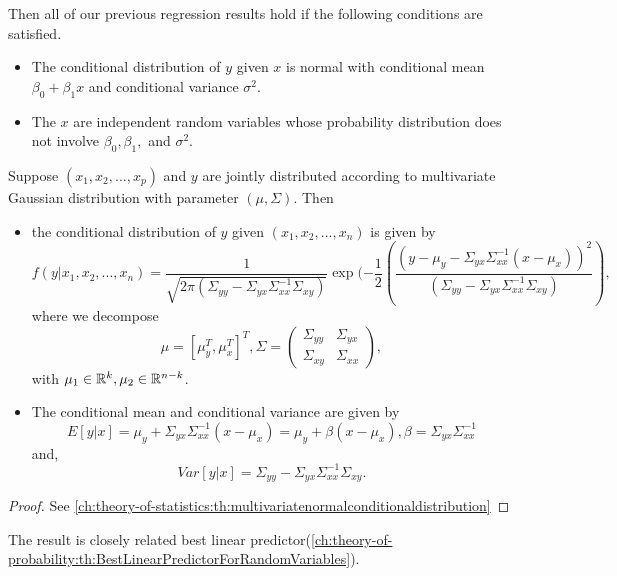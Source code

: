 \begin{refsection}
\begin{note}
Then all of our previous regression results hold if the following conditions are satisfied.
\begin{itemize}
	\item The conditional distribution of $y$ given $x$ is normal with conditional mean $\beta_0 + \beta_1 x$ and conditional variance $\sigma^2$.
	\item The $x$ are independent random variables whose probability distribution does not involve $\beta_0,\beta_1,$ and $\sigma^2$.
\end{itemize}	
\end{note}


\begin{theorem}
Suppose $(x_1,x_2,...,x_p)$ and $y$ are jointly distributed	according to multivariate Gaussian distribution with parameter $(\mu,\Sigma)$.
Then 
\begin{itemize}
	\item the conditional distribution of $y$ given $(x_1,x_2,...,x_n)$ is given by	
		$$f(y|x_1,x_2,...,x_n)= \frac{1}{\sqrt{2\pi(\Sigma_{yy} - \Sigma_{yx}\Sigma_{xx}^{-1}\Sigma_{xy})}}\exp(-\frac{1}{2}(\frac{(y - \mu_y - \Sigma_{yx}\Sigma_{xx}^{-1}(x-\mu_x))^2}{(\Sigma_{yy} - \Sigma_{yx}\Sigma_{xx}^{-1}\Sigma_{xy})}),$$
	where we decompose $$\mu = [\mu_y^T ,\mu_x^T]^T,\Sigma = 
	\begin{pmatrix}
	\Sigma_{yy} & \Sigma_{yx} \\
	\Sigma_{xy} & \Sigma_{xx}
	\end{pmatrix}
	,$$ 
	with $\mu_1 \in \mathbb{R}^k,\mu_2\in \mathbb{R}^{n-k}$.
	\item The conditional mean and conditional variance are given by
	$$E[y|x] = \mu_y + \Sigma_{yx}\Sigma_{xx}^{-1}(x-\mu_x) = \mu_y + \beta(x - \mu_x),\beta = \Sigma_{yx}\Sigma_{xx}^{-1}$$
	and, $$Var[y|x]=\Sigma_{yy} - \Sigma_{yx}\Sigma_{xx}^{-1}\Sigma_{xy}.$$	
\end{itemize}
\end{theorem}
\begin{proof}
See 	
\autoref{ch:theory-of-statistics:th:multivariatenormalconditionaldistribution}
\end{proof}

\begin{remark}
The result is closely related best linear predictor(\autoref{ch:theory-of-probability:th:BestLinearPredictorForRandomVariables}). 	
\end{remark}



\end{refsection}
